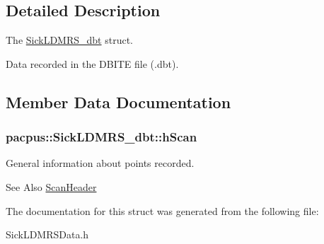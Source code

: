 \subsection{Detailed Description}
The \hyperlink{structpacpus_1_1SickLDMRS__dbt}{Sick\-L\-D\-M\-R\-S\-\_\-dbt} struct. 

Data recorded in the D\-B\-I\-T\-E file (.dbt). 

\subsection{Member Data Documentation}
\hypertarget{structpacpus_1_1SickLDMRS__dbt_ae70266d0c8dc88727f72ff7b99cc34d5}{
\subsubsection[{h\-Scan}]{ pacpus\-::\-Sick\-L\-D\-M\-R\-S\-\_\-dbt\-::h\-Scan}}\label{structpacpus_1_1SickLDMRS__dbt_ae70266d0c8dc88727f72ff7b99cc34d5}


General information about points recorded. 

\begin{DoxySeeAlso}{See Also}
\hyperlink{structpacpus_1_1ScanHeader}{Scan\-Header} 
\end{DoxySeeAlso}


The documentation for this struct was generated from the following file\-:\begin{DoxyCompactItemize}
\item 
Sick\-L\-D\-M\-R\-S\-Data.\-h\end{DoxyCompactItemize}
